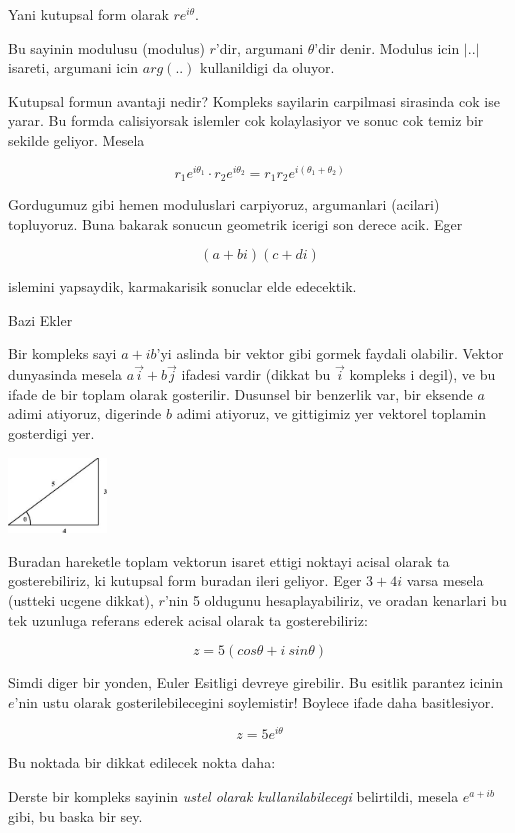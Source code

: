 \documentclass[12pt,fleqn]{article}
\begin{document}
Yani kutupsal form olarak $re^{i\theta}$. 

Bu sayinin modulusu (modulus) $r$'dir, argumani $\theta$'dir denir. Modulus
icin $|..|$ isareti, argumani icin $arg(..)$ kullanildigi da oluyor. 

Kutupsal formun avantaji nedir? Kompleks sayilarin carpilmasi sirasinda cok
ise yarar. Bu formda calisiyorsak islemler cok kolaylasiyor ve sonuc cok
temiz bir sekilde geliyor. Mesela

\[ r_1 e^{i\theta_1} \cdot r_2 e^{i\theta_2} = r_1r_2 e^{i(\theta_1+\theta_2)}\]

Gordugumuz gibi hemen moduluslari carpiyoruz, argumanlari (acilari)
topluyoruz. Buna bakarak sonucun geometrik icerigi son derece acik. Eger 

\[ (a+bi)(c+di) \]

islemini yapsaydik, karmakarisik sonuclar elde edecektik.

Bazi Ekler 

Bir kompleks sayi $a+ib$'yi aslinda bir vektor gibi gormek faydali
olabilir. Vektor dunyasinda mesela $a\vec{i} + b\vec{j}$ ifadesi vardir
(dikkat bu $\vec{i}$ kompleks i degil), ve bu ifade de bir toplam olarak
gosterilir. Dusunsel bir benzerlik var, bir eksende $a$ adimi atiyoruz,
digerinde $b$ adimi atiyoruz, ve gittigimiz yer vektorel toplamin
gosterdigi yer.

\includegraphics[height=2cm]{345.png}

Buradan hareketle toplam vektorun isaret ettigi noktayi acisal olarak ta
gosterebiliriz, ki kutupsal form buradan ileri geliyor. Eger $3 + 4i$ varsa
mesela (ustteki ucgene dikkat), $r$'nin 5 oldugunu hesaplayabiliriz, ve
oradan kenarlari bu tek uzunluga referans ederek acisal olarak ta
gosterebiliriz:

\[ z = 5(cos\theta + i \ sin\theta ) \]

Simdi diger bir yonden, Euler Esitligi devreye girebilir. Bu esitlik
parantez icinin $e$'nin ustu olarak gosterilebilecegini soylemistir!
Boylece ifade daha basitlesiyor.

\[ z = 5e^{i\theta} \]

Bu noktada bir dikkat edilecek nokta daha:

Derste bir kompleks sayinin {\em ustel olarak kullanilabilecegi}
belirtildi, mesela $e^{a+ib}$ gibi, bu baska bir sey. 
\end{document}
